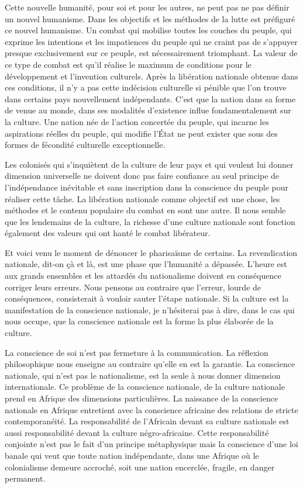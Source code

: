 \documentclass[french,twoside]{book} %
\begin{document}
 Cette nouvelle humanité, pour soi et pour les autres, ne peut pas ne pas définir un nouvel humanisme. Dans les objectifs et les méthodes de la lutte est préfiguré ce nouvel humanisme. Un combat qui mobilise toutes les couches du peuple, qui exprime les intentions et les impatiences du peuple qui ne craint pas de s’appuyer presque exclusivement sur ce peuple, est nécessairement triomphant. La valeur de ce type de combat est qu’il réalise le maximum de conditions pour le développement et l’invention culturels. Après la libération nationale obtenue dans ces conditions, il n’y a pas cette indécision culturelle si pénible que l’on trouve dans certains pays nouvellement indépendants. C’est que la nation dans sa forme de venue au monde, dans ses modalités d’existence influe fondamentalement sur la culture. Une nation née de l’action concertée du peuple, qui incarne les aspirations réelles du peuple, qui modifie l’État ne peut exister que sous des formes de fécondité culturelle exceptionnelle.\par
Les colonisés qui s’inquiètent de la culture de leur pays et qui veulent lui donner dimension universelle ne doivent donc pas faire confiance au seul principe de l’indépendance inévitable et sans inscription dans la conscience du peuple pour réaliser cette tâche. La libération nationale comme objectif est une chose, les méthodes et le contenu populaire du combat en sont une autre. Il nous semble que les lendemains de la culture, la richesse d’une culture nationale sont fonction également des valeurs qui ont hanté le combat libérateur.\par
\bigbreak
\noindent Et voici venu le moment de dénoncer le pharisaïsme de certains. La revendication nationale, dit-on çà et là, est une phase que l’humanité a dépassée. L’heure est aux grands ensembles et les attardés du nationalisme doivent en conséquence corriger leurs erreurs. Nous pensons au contraire que l’erreur, lourde de conséquences, consisterait à vouloir sauter l’étape nationale. Si la culture est la manifestation de la conscience nationale, je n’hésiterai pas à dire, dans le cas qui nous occupe, que la conscience nationale est la forme la plus élaborée de la culture.\par
 La conscience de soi n’est pas fermeture à la communication. La réflexion philosophique nous enseigne au contraire qu’elle en est la garantie. La conscience nationale, qui n’est pas le nationalisme, est la seule à nous donner dimension internationale. Ce problème de la conscience nationale, de la culture nationale prend en Afrique des dimensions particulières. La naissance de la conscience nationale en Afrique entretient avec la conscience africaine des relations de stricte contemporanéité. La responsabilité de l’Africain devant sa culture nationale est aussi responsabilité devant la culture négro-africaine. Cette responsabilité conjointe n’est pas le fait d’un principe métaphysique mais la conscience d’une loi banale qui veut que toute nation indépendante, dans une Afrique où le colonialisme demeure accroché, soit une nation encerclée, fragile, en danger permanent.\par
\end{document}
